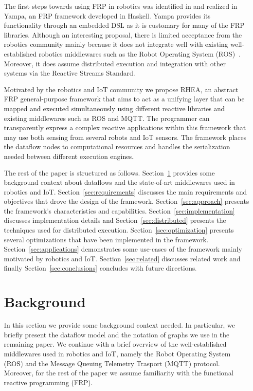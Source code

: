 \documentclass[sigplan,screen]{acmart}
\begin{document}
The first steps towards using FRP in robotics was identified in \cite{arrows_robots}
and realized in Yampa, an FRP framework
developed in Haskell. Yampa provides its functionality through an embedded DSL
as it is customary for many of the FRP libraries. Although an interesting proposal,
there is limited acceptance from the robotics community mainly because it does
not integrate well with existing well-established robotics middlewares such as
the Robot Operating System (ROS)~\cite{ROS}. Moreover, it does assume distributed execution
and integration with other systems via the Reactive Streams Standard.

Motivated by the robotics and IoT community we propose \textsc{RHEA}, an abstract
FRP general-purpose framework that aims to act as a unifying layer that can
be mapped and executed simultaneously using different reactive libraries
and existing middlewares such as ROS and MQTT. The programmer can transparently
express a complex reactive applications within this framework that may use
both sensing from several robots and IoT sensors. The framework places the
dataflow nodes to computational resources and handles the serialization needed
between different execution engines.

The rest of the paper is structured as follows.
Section~\ref{sec:background} provides some background context about dataflows and
the state-of-art middlewares used in robotics and IoT.
Section~\ref{sec:requirements} discusses the main requirements and objectives that drove the design of the framework.
Section~\ref{sec:approach} presents the framework's characteristics and capabilities.
Section~\ref{sec:implementation} discusses implementation details and
Section~\ref{sec:distributed} presents the techniques used for distributed execution.
Section~\ref{sec:optimization} presents several optimizations that have been implemented in the
framework. Section~\ref{sec:applications} demonstrates some use-cases of the framework
mainly motivated by robotics and IoT.
Section~\ref{sec:related} discusses related work and
finally Section~\ref{sec:conclusions} concludes with future directions.

\section{Background} \label{sec:background}
In this section we provide some background context needed. In particular, we
briefly present the dataflow model and the notation of graphs we use in the
remaining paper. We continue with a brief overview of the well-established
middlewares used in robotics and IoT, namely the Robot Operating System (ROS)
and the Message Queuing Telemetry Trasport (MQTT) protocol.
Moreover, for the rest of the paper we assume familiarity with the functional
reactive programming (FRP).
\end{document}
